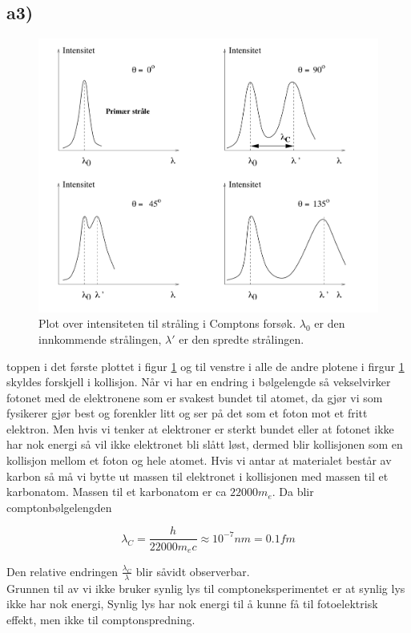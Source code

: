 \documentclass[norsk,a4paper,12pt]{article}
\begin{document}
\subsection*{a3)}


\begin{figure}[h]
\includegraphics[scale=0.4]{intensitetcompton}
\caption{Plot over intensiteten til stråling i Comptons forsøk. $\lambda_0$ er den innkommende strålingen, $\lambda'$ er den spredte strålingen.}
\label{fig:intensitetcompton}
\end{figure}

toppen i det første plottet i figur \ref{fig:intensitetcompton} og  til venstre i alle de andre plotene i firgur \ref{fig:intensitetcompton}  skyldes forskjell i kollisjon. Når vi har en endring i bølgelengde så vekselvirker fotonet med de elektronene som er svakest bundet til atomet, da gjør vi som fysikerer gjør best og forenkler litt og ser på det som et foton mot et fritt elektron. Men hvis vi tenker at elektroner er sterkt bundet eller at fotonet ikke har nok energi så vil ikke elektronet bli slått løst, dermed blir kollisjonen som en kollisjon mellom et foton og hele atomet. Hvis vi antar at materialet består av karbon så må vi bytte ut massen til elektronet i kollisjonen med massen til et karbonatom. Massen til et karbonatom er ca $22000m_e$. Da blir comptonbølgelengden 

\begin{equation}
\lambda_C = \frac{h}{22000m_ec} \approx 10^{-7} nm = 0.1fm
\end{equation}

Den relative endringen $\frac{\lambda_C}{\lambda}$ blir såvidt observerbar. 
\\

Grunnen til av vi ikke bruker synlig lys til comptoneksperimentet er at synlig lys ikke har nok energi, Synlig lys har nok energi til å kunne få til fotoelektrisk effekt, men ikke til comptonspredning.
\end{document}
